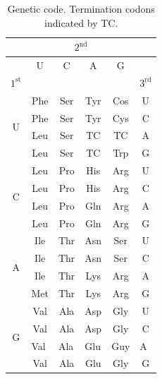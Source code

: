 \documentclass[../waterman_intro_comp_bio.tex]{subfiles}
\begin{document}
\begin{outline}
        \begin{table}[]
            \centering
            \begin{tabular}{cccccc}
                \multicolumn{6}{c}{\(2^{\text{nd}}\)}  \\ \hline
                                   & U   & C   & A   & G   &   \\ \hline
                \(1^{\text{st}}\)  &     &     &     &     & \(3^{\text{rd}}\) \\ \hline
                \multirow{4}{*}{U} & Phe & Ser & Tyr & Cos & U \\
                                   & Phe & Ser & Tyr & Cys & C \\
                                   & Leu & Ser & TC  & TC  & A \\
                                   & Leu & Ser & TC  & Trp & G \\ \hline
                \multirow{4}{*}{C} & Leu & Pro & His & Arg & U \\
                                   & Leu & Pro & His & Arg & C \\
                                   & Leu & Pro & Gln & Arg & A \\
                                   & Leu & Pro & Gln & Arg & G \\ \hline
                \multirow{4}{*}{A} & Ile & Thr & Asn & Ser & U \\
                                   & Ile & Thr & Asn & Ser & C \\
                                   & Ile & Thr & Lys & Arg & A \\
                                   & Met & Thr & Lys & Arg & G \\ \hline
                \multirow{4}{*}{G} & Val & Ala & Asp & Gly & U \\
                                   & Val & Ala & Asp & Gly & C \\
                                   & \multicolumn{1}{l}{Val} & \multicolumn{1}{l}{Ala} & \multicolumn{1}{l}{Glu} & \multicolumn{1}{l}{Guy} & \multicolumn{1}{l}{A} \\
                                   & Val & Ala & Glu & Gly & G                    
            \end{tabular}
            \caption{Genetic code. Termination codons indicated by TC.}
            \label{gc_table}
            \end{table}
        \end{outline}
\end{document}
